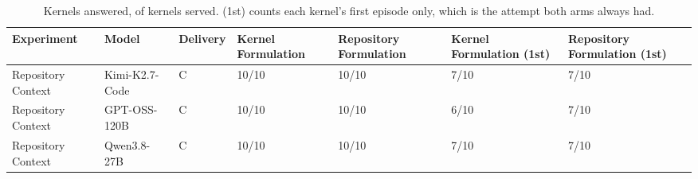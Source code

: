 \begin{table}[t]
  \centering
  \caption{Kernels answered, of kernels served. (1st) counts each kernel's first episode only, which is the attempt both arms always had.}
  \label{tab:solve-rate}
  \begin{tabular}{lllllll}
    \toprule
    Experiment & Model & Delivery & Kernel Formulation & Repository Formulation & Kernel Formulation (1st) & Repository Formulation (1st) \\
    \midrule
    Repository Context & Kimi-K2.7-Code & C & 10/10 & 10/10 & 7/10 & 7/10 \\
    Repository Context & GPT-OSS-120B & C & 10/10 & 10/10 & 6/10 & 7/10 \\
    Repository Context & Qwen3.8-27B & C & 10/10 & 10/10 & 7/10 & 7/10 \\
    \bottomrule
  \end{tabular}
\end{table}

